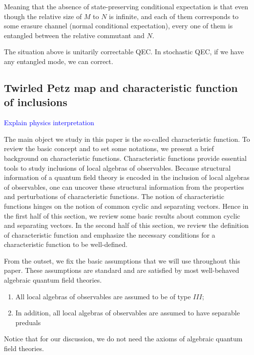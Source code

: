 \documentclass[a4paper,11pt]{article}
\theoremstyle{definition}
\newcommand{\NL}[1]{\textcolor{blue}{#1}}
\begin{document}
Meaning that 
the absence of state-preserving conditional expectation is that even though the relative size of $M$ to $N$ is infinite, and each of them corresponds to some erasure channel (normal conditional expectation), every one of them is entangled between the relative commutant and $N$. 

The situation above is unitarily correctable QEC. In stochastic QEC, if we have any entangled mode, we can correct. 










\subsection*{Twirled Petz map and characteristic function of inclusions}


\NL{Explain physics interpretation}

The main object we study in this paper is the so-called characteristic function\cite{revolutionizing}. To review the basic concept and to set some notations, we present a brief background on characteristic functions. Characteristic functions provide essential tools to study inclusions of local algebras of observables. Because structural information of a quantum field theory is encoded in the inclusion of local algebras of observables\cite{haag2012local}, one can uncover these structural information from the properties and perturbations of characteristic functions. The notion of characteristic functions hinges on the notion of common cyclic and separating vectors. Hence in the first half of this section, we review some basic results about common cyclic and separating vectors. In the second half of this section, we review the definition of characteristic function and emphasize the necessary conditions for a characteristic function to be well-defined.

From the outset, we fix the basic assumptions that we will use throughout this paper. These assumptions are standard and are satisfied by most well-behaved algebraic quantum field theories.
\begin{enumerate}
    \item All local algebras of observables are assumed to be of type $III$;
    \item In addition, all local algebras of observables are assumed to have separable preduals
\end{enumerate}
Notice that for our discussion, we do not need the axioms of algebraic quantum field theories.
\end{document}
